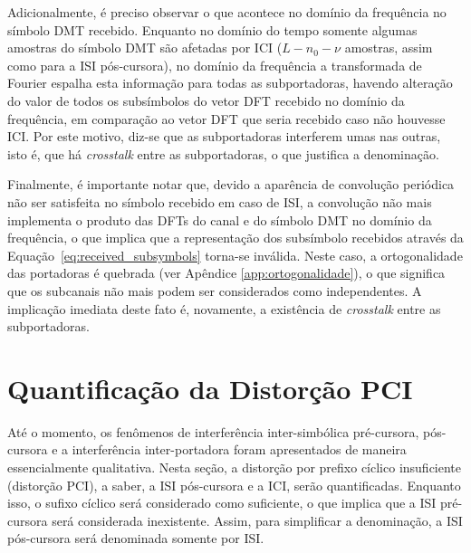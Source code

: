 Adicionalmente, é preciso observar o que acontece no domínio da frequência no símbolo DMT recebido. Enquanto no domínio do tempo somente algumas amostras do símbolo DMT são afetadas por ICI ($L - n_0 - \nu$ amostras, assim como para a ISI pós-cursora), no domínio da frequência a transformada de Fourier espalha esta informação para todas as subportadoras, havendo alteração do valor de todos os subsímbolos do vetor DFT recebido no domínio da frequência, em comparação ao vetor DFT que seria recebido caso não houvesse ICI. Por este motivo, diz-se que as subportadoras interferem umas nas outras, isto é, que há \textsl{crosstalk} entre as subportadoras, o que justifica a denominação.

Finalmente, é importante notar que, devido a aparência de convolução periódica não ser satisfeita no símbolo recebido em caso de ISI, a convolução não mais implementa o produto das DFTs do canal e do símbolo DMT no domínio da frequência, o que implica que a representação dos subsímbolo recebidos através da Equação~\ref{eq:received_subsymbols} torna-se inválida. Neste caso, a ortogonalidade das portadoras é quebrada (ver Apêndice \ref{app:ortogonalidade}), o que significa que os subcanais não mais podem ser considerados como independentes. A implicação imediata deste fato é, novamente, a existência de \textsl{crosstalk} entre as subportadoras.

\section{Quantificação da Distorção PCI}
\label{sec:calculo_distorcao}

Até o momento, os fenômenos de interferência inter-simbólica pré-cursora, pós-cursora e a interferência inter-portadora foram apresentados de maneira essencialmente qualitativa. Nesta seção, a distorção por prefixo cíclico insuficiente (distorção PCI), a saber, a ISI pós-cursora e a ICI, serão quantificadas. Enquanto isso, o sufixo cíclico será considerado como suficiente, o que implica que a ISI pré-cursora será considerada inexistente. Assim, para simplificar a denominação, a ISI pós-cursora será denominada somente por ISI.

